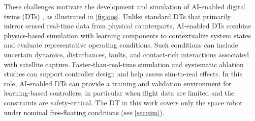 \documentclass{ieeeaccess}
\begin{document}
These challenges motivate the development and simulation of AI-enabled digital twins (DTs)
\cite{kaigom2025deep,la2025deep}, as illustrated in \cref{fig:oos}. Unlike standard DTs that primarily mirror sensed
real-time data from physical counterparts, AI-enabled DTs combine physics-based simulation with learning
components to contextualize system states and evaluate representative operating conditions. Such conditions
can include uncertain dynamics, disturbances, faults, and contact-rich interactions associated with
satellite capture. Faster-than-real-time simulation and systematic ablation studies can support controller
design and help assess sim-to-real effects. In this role, AI-enabled DTs can provide a training and
validation environment for learning-based controllers, in particular when flight data are limited and the
constraints are safety-critical. The DT in this work covers only the space robot under nominal
free-floating conditions (see \cref{sec:sim}).
\end{document}
